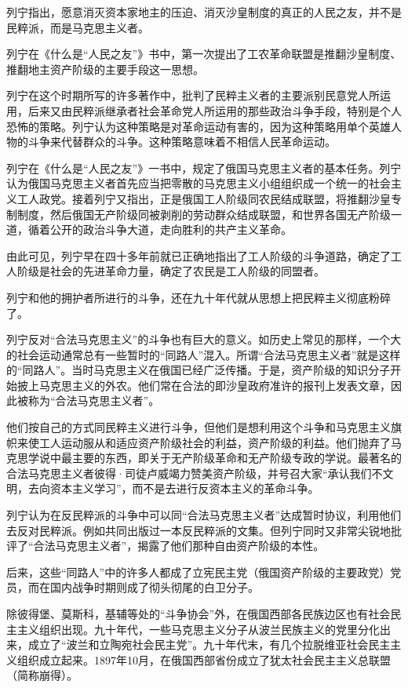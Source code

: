 列宁指出，愿意消灭资本家地主的压迫、消灭沙皇制度的真正的人民之友，并不是民粹派，而是马克思主义者。

列宁在《什么是“人民之友”》书中，第一次提出了工农革命联盟是推翻沙皇制度、推翻地主资产阶级的主要手段这一思想。

列宁在这个时期所写的许多著作中，批判了民粹主义者的主要派别民意党人所运用，后来又由民粹派继承者社会革命党人所运用的那些政治斗争手段，特别是个人恐怖的策略。列宁认为这种策略是对革命运动有害的，因为这种策略用单个英雄人物的斗争来代替群众的斗争。这种策略意味着不相信人民革命运动。

列宁在《什么是“人民之友”》一书中，规定了俄国马克思主义者的基本任务。列宁认为俄国马克思主义者首先应当把零散的马克思主义小组组织成一个统一的社会主义工人政党。接着列宁又指出，正是俄国工人阶级同农民结成联盟，将推翻沙皇专制制度，然后俄国无产阶级同被剥削的劳动群众结成联盟，和世界各国无产阶级一道，循着公开的政治斗争大道，走向胜利的共产主义革命。

由此可见，列宁早在四十多年前就已正确地指出了工人阶级的斗争道路，确定了工人阶级是社会的先进革命力量，确定了农民是工人阶级的同盟者。

列宁和他的拥护者所进行的斗争，还在九十年代就从思想上把民粹主义彻底粉碎了。

列宁反对“合法马克思主义”的斗争也有巨大的意义。如历史上常见的那样，一个大的社会运动通常总有一些暂时的“同路人”混入。所谓“合法马克思主义者”就是这样的“同路人”。当时马克思主义在俄国已经广泛传播。于是，资产阶级的知识分子开始披上马克思主义的外农。他们常在合法的即沙皇政府准许的报刊上发表文章，因此被称为“合法马克思主义者”。

他们按自己的方式同民粹主义进行斗争，但他们是想利用这个斗争和马克思主义旗帜来使工人运动服从和适应资产阶级社会的利益，资产阶级的利益。他们抛弃了马克思学说中最主要的东西，即关于无产阶级革命和无产阶级专政的学说。最著名的合法马克思主义者彼得·司徒卢威竭力赞美资产阶级，并号召大家“承认我们不文明，去向资本主义学习”，而不是去进行反资本主义的革命斗争。

列宁认为在反民粹派的斗争中可以同“合法马克思主义者”达成暂时协议，利用他们去反对民粹派。例如共同出版过一本反民粹派的文集。但列宁同时又非常尖锐地批评了“合法马克思主义者”，揭露了他们那种自由资产阶级的本性。

后来，这些“同路人”中的许多人都成了立宪民主党（俄国资产阶级的主要政党）党员，而在国内战争时期则成了彻头彻尾的白卫分子。

除彼得堡、莫斯科，基辅等处的“斗争协会”外，在俄国西部各民族边区也有社会民主主义组织出现。九十年代，一些马克思主义分子从波兰民族主义的党里分化出来，成立了“波兰和立陶宛社会民主党”。九十年代末，有几个拉脱维亚社会民主主义组织成立起来。1897年10月，在俄国西部省份成立了犹太社会民主主义总联盟（简称崩得）。

